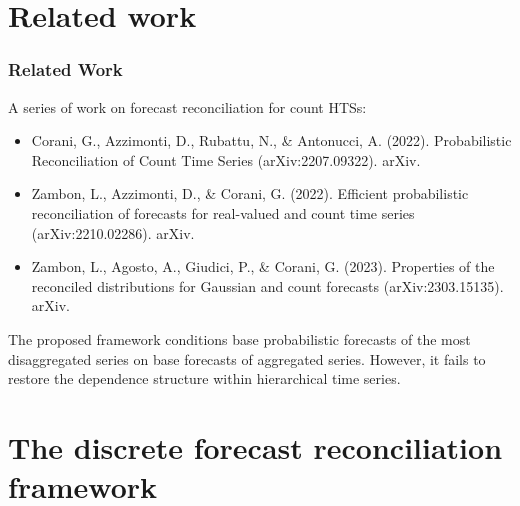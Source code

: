 \documentclass[12pt]{beamer}
\begin{document}
\section{Related work}
\begin{frame}
\frametitle{Related Work}

A series of work on forecast reconciliation for count HTSs:

\begin{itemize}
    \fontsize{9}{10.2}\selectfont
    \item Corani, G., Azzimonti, D., Rubattu, N., \& Antonucci, A. (2022). Probabilistic Reconciliation of Count Time Series (arXiv:2207.09322). arXiv.
    \item Zambon, L., Azzimonti, D., \& Corani, G. (2022). Efficient probabilistic reconciliation of forecasts for real-valued and count time series (arXiv:2210.02286). arXiv.
    \item Zambon, L., Agosto, A., Giudici, P., \& Corani, G. (2023). Properties of the reconciled distributions for Gaussian and count forecasts (arXiv:2303.15135). arXiv.
\end{itemize}

The proposed framework conditions base probabilistic forecasts of the most disaggregated series on base forecasts of aggregated series. However, it fails to restore the dependence structure within hierarchical time series.


\end{frame}


\section{The discrete forecast reconciliation framework}
\end{document}
